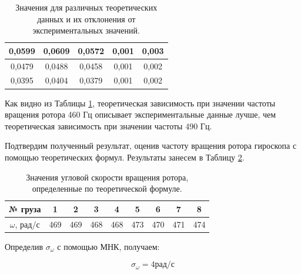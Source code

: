 \documentclass[12pt,a4paper]{article}
\begin{document}
\begin{table}[h!]
{\begin{tabular}{|c|c|c|c|c|}
0,0599                                                                           & 0,0609                                                                                          & 0,0572                                                                                         & 0,001 & 0,003 \\ \hline
0,0479                                                                           & 0,0488                                                                                          & 0,0458                                                                                         & 0,001 & 0,002 \\ \hline
0,0395                                                                           & 0,0404                                                                                          & 0,0379                                                                                         & 0,001 & 0,002 \\ \hline
\end{tabular}%
}
\caption{Значения для различных теоретических данных и их отклонения от экспериментальных значений.}
\label{tab:deflection}
\end{table}

Как видно из Таблицы \ref{tab:deflection}, теоретическая зависимость при значении частоты вращения ротора 460 Гц описывает экспериментальные данные лучше, чем теоретическая зависимость при значении частоты 490 Гц.

Подтвердим полученный результат, оценив частоту вращения ротора гироскопа с помощью теоретических формул. Результаты занесем в Таблицу \ref{tab:mnk_for_omega}.

\begin{table}[h]
\centering
\begin{tabular}{|c|c|c|c|c|c|c|c|c|}
\hline
№ груза & 1        & 2       & 3        & 4        & 5        & 6        & 7        & 8        \\ \hline
$\omega$, рад/с   & 469 & 469 & 468 & 468 & 473 & 470 & 471 & 474 \\ \hline
\end{tabular}
\caption{Значения угловой скорости вращения ротора, определенные по теоретической формуле.}
\label{tab:mnk_for_omega}
\end{table}

Определив $\sigma_{\omega}$ с помощью МНК, получаем:

\begin{equation}
	\sigma_{\omega} = 4 \text{рад/с}
\end{equation}
\end{document}
